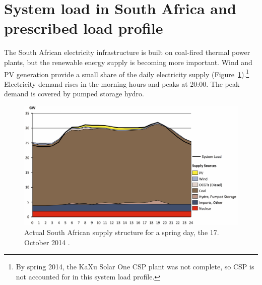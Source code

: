 \pagebreak
\section{System load in South Africa and prescribed load profile} \label{SystemloadinSA}

The South African electricity infrastructure is built on coal-fired thermal power plants, but the renewable energy supply is becoming more important. Wind and \ac{PV} generation provide a small share of the daily electricity supply (Figure~\ref{systemload}).\footnote{By spring 2014, the KaXu Solar One CSP plant was not complete, so CSP is not accounted for in this system load profile.} Electricity demand rises in the morning hours and peaks at 20:00. The peak demand is covered by pumped storage hydro. 

\begin{figure}[htbp]  
\centering
\includegraphics[width=1\linewidth]{FIG/systemload}
\caption[Actual South African supply structure for a spring day, the 17. October 2014.]{Actual South African supply structure for a spring day, the 17. October 2014 \cite{CSIR2015}.}\label{systemload}
\end{figure}

